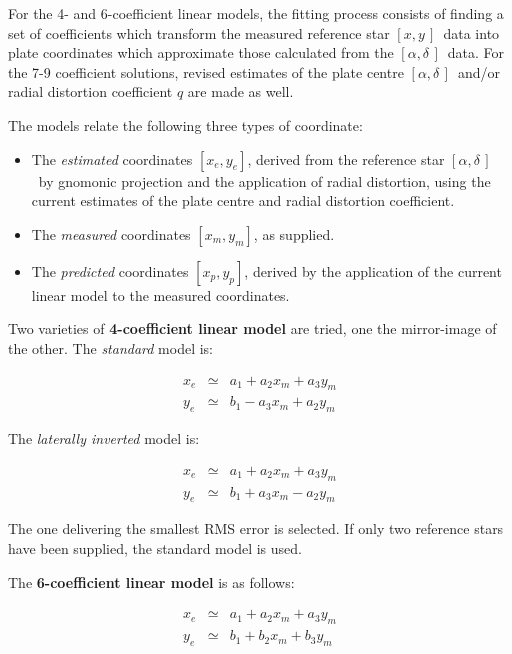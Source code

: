 \documentclass[twoside,11pt]{article}
\renewcommand{\_}{\texttt{\symbol{95}}}
\newcommand{\radec}     {$[\alpha,\delta\,]$}
\newcommand{\xy}        {$[x,y\,]$}
\begin{document}
For the 4- and 6-coefficient linear models, the fitting process
consists of finding a set of coefficients which transform
the measured reference star \xy\ data into plate coordinates
which approximate those calculated from the \radec\ data.
For the 7-9 coefficient solutions, revised estimates of
the plate centre \radec\ and/or radial distortion
coefficient $q$ are made as well.

The models relate the following three types of coordinate:

\begin{itemize}

\item The \textit{estimated} coordinates $[x_{e},y_{e}]$, derived
   from the reference star \radec\ by gnomonic projection and the
   application of radial distortion, using the current estimates of the
   plate centre and radial distortion coefficient.

\item The \textit{measured} coordinates $[x_{m},y_{m}]$, as supplied.

\item The \textit{predicted} coordinates $[x_{p},y_{p}]$, derived by the
   application of the current linear model to the measured coordinates.

\end{itemize}

Two varieties of \textbf{4-coefficient linear model} are tried, one
the mirror-image of the other.  The \textit{standard} model is:

\begin{eqnarray*}
x_{e} & \simeq & a_{1} + a_{2} x_{m} + a_{3} y_{m} \\
y_{e} & \simeq & b_{1} - a_{3} x_{m} + a_{2} y_{m}
\end{eqnarray*}

The \textit{laterally inverted} model is:

\begin{eqnarray*}
x_{e} & \simeq & a_{1} + a_{2} x_{m} + a_{3} y_{m} \\
y_{e} & \simeq & b_{1} + a_{3} x_{m} - a_{2} y_{m}
\end{eqnarray*}

The one delivering the smallest RMS error is selected.  If only
two reference stars have been supplied, the standard model is
used.

The \textbf{6-coefficient linear model} is as follows:

\begin{eqnarray*}
x_{e} & \simeq & a_{1} + a_{2} x_{m} + a_{3} y_{m} \\
y_{e} & \simeq & b_{1} + b_{2} x_{m} + b_{3} y_{m}
\end{eqnarray*}
\end{document}
